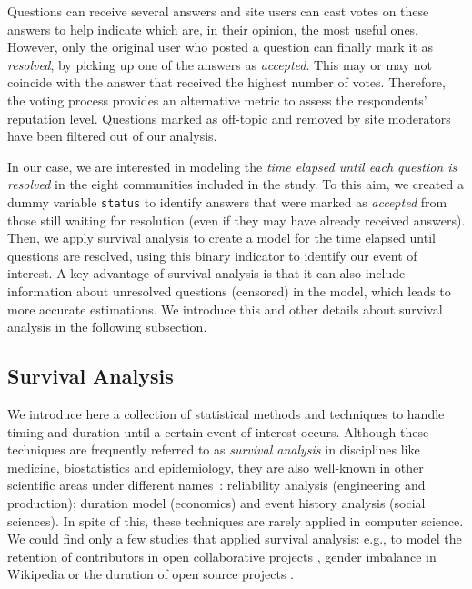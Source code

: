 \documentclass{chi2012}
\begin{document}
Questions can receive several answers and site users can cast votes on these answers to
help indicate which are, in their opinion, the most useful ones. However, only the original 
user who posted a question can  finally mark it as \textit{resolved}, by picking up one of 
the answers as \textit{accepted}. This may or may not coincide with the answer that received 
the highest number of votes. Therefore, the voting process provides an alternative metric 
to assess the respondents' reputation level. Questions marked as off-topic and removed by 
site moderators have been filtered out of our analysis. 

In our case, we are interested in modeling the \textit{time elapsed until each 
question is resolved} in the eight communities included in the study. To this aim, we 
created a dummy variable \texttt{status} to identify answers that were marked as
\textit{accepted} from those still waiting for resolution (even if they may have
already received answers). Then, we apply survival 
analysis to create a model for the time elapsed until questions are resolved, using 
this binary indicator to identify our event of interest. A key advantage
of survival analysis is that it can also include information about unresolved questions (censored)
in the model, which leads to more accurate estimations. We introduce this and
other details about survival analysis in the following subsection.

\subsection{Survival Analysis}

We introduce here a collection of statistical methods and techniques to handle 
timing and duration until a certain event of interest occurs. Although these techniques
are frequently referred to as \textit{survival analysis} 
in disciplines like medicine, biostatistics 
and epidemiology, they are also well-known in other scientific areas under different names~\cite{mills2011}:
reliability analysis (engineering and production); duration model (economics) and
event history analysis (social sciences). In spite of this, these techniques are rarely applied in computer science. We could find only a few studies that applied survival analysis: e.g., to model the retention of contributors in open collaborative projects
\cite{ortega2009, zhang2012}, gender imbalance in Wikipedia \cite{lam2011} or the
duration of open source projects \cite{samoladas2010}.
\end{document}
